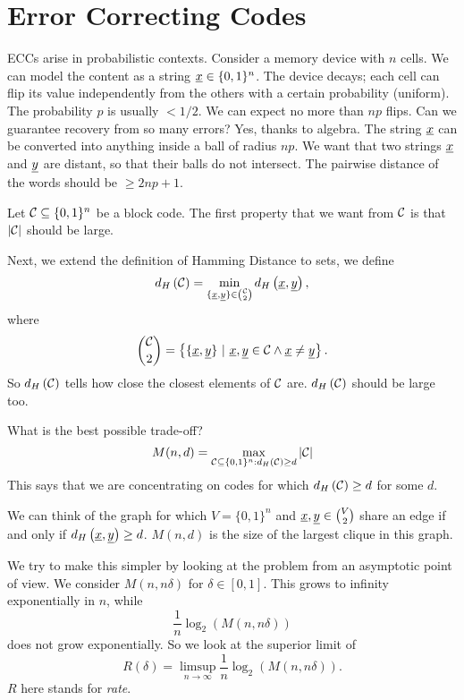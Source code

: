 \chapter{Error Correcting Codes}

\acp{ECC} arise in probabilistic contexts.
Consider a memory device with $n$ cells.
We can model the content as a string $\underline{x} \in \{0, 1\}^n$.
The device decays; each cell can flip its value independently from the others with a certain probability (uniform).
The probability $p$ is usually $< 1/2$.
We can expect no more than $np$ flips.
Can we guarantee recovery from so many errors?
Yes, thanks to algebra.
The string $\underline{x}$ can be converted into anything inside a ball of radius $np$.
We want that two strings $\underline{x}$ and $\underline{y}$ are distant, so that their balls do not intersect.
The pairwise distance of the words should be $\ge 2np + 1$.

Let $\mathcal{C} \subseteq \{0, 1\}^n$ be a block code.
The first property that we want from $\mathcal{C}$ is that $\left|{\mathcal{C}}\right|$ should be large.

Next, we extend the definition of Hamming Distance to sets, \ie we define
\begin{equation*}
	d_H \left({\mathcal{C}}\right) = \min_{\{\underline{x}, \underline{y}\} \in \binom{\mathcal{C}}{2}} d_H \left({\underline{x}, \underline{y}}\right),
\end{equation*}
where 
\begin{equation*}
	\binom{\C}{2} = \left\{ \{\str{x}, \str{y}\}\ |\ \str{x}, \str{y} \in \C \land \str{x} \neq \str{y} \right\}. 
\end{equation*}
So $d_H \left({\mathcal{C}}\right)$ tells how close the closest elements of $\mathcal{C}$ are.
$d_H \left({\mathcal{C}}\right)$ should be large too.

What is the best possible trade-off?
\begin{equation*}
	M(n, d) = \max_{\mathcal{C} \subseteq \{0,1\}^{n} : d_H \left({\mathcal{C}}\right) \ge d} \left|{\mathcal{C}}\right|
\end{equation*}
This says that we are concentrating on codes for which $d_H \left({\mathcal{C}}\right) \ge d$ for some $d$.

We can think of the graph for which $V = \{0, 1\}^n$ and $\underline{x}, \underline{y} \in \binom{V}{2}$ share an edge if and only if $d_H \left({\underline{x}, \underline{y}}\right) \ge d$.
$M(n,d)$ is the size of the largest clique in this graph.

We try to make this simpler by looking at the problem from an asymptotic point of view.
We consider $M(n, n \delta)$ for $\delta \in [0, 1]$.
This grows to infinity exponentially in $n$, while
\begin{equation*}
	\frac{1}{n} \log_2 \left( M(n, n \delta) \right)
\end{equation*}
does not grow exponentially.
So we look at the superior limit of
\begin{equation*}
	R(\delta) = \limsup_{n \to \infty} \frac{1}{n} \log_2 \left( M(n, n \delta) \right).
\end{equation*}
$R$ here stands for \emph{rate}.

